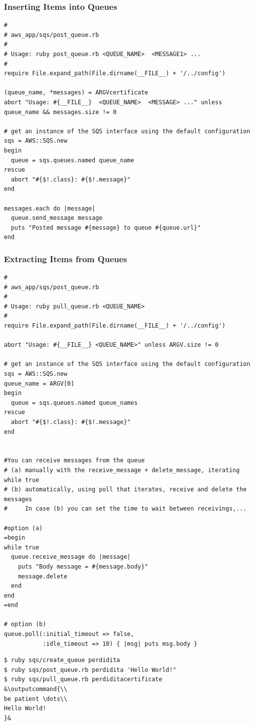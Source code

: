 \documentclass{beamer}
\newcommand{\outputcommand}[1]{\color{darkgreen}{#1|}}
\begin{document}
\begin{frame}
\frametitle{Inserting Items into Queues}
\lstset{language=Ruby, style=eclipse}
\begin{lstlisting}[escapechar=&]
#
# aws_app/sqs/post_queue.rb
#
# Usage: ruby post_queue.rb <QUEUE_NAME>  <MESSAGE1> ...
#
require File.expand_path(File.dirname(__FILE__) + '/../config')

(queue_name, *messages) = ARGVcertificate
abort "Usage: #{__FILE__}  <QUEUE_NAME>  <MESSAGE> ..." unless queue_name && messages.size != 0

# get an instance of the SQS interface using the default configuration
sqs = AWS::SQS.new
begin
  queue = sqs.queues.named queue_name
rescue
  abort "#{$!.class}: #{$!.message}"
end

messages.each do |message|
  queue.send_message message
  puts "Posted message #{message} to queue #{queue.url}"
end
\end{lstlisting}
\end{frame}
\begin{frame}
\frametitle{Extracting Items from Queues}
\lstset{language=Ruby, style=eclipse}
\begin{lstlisting}[escapechar=&]
#
# aws_app/sqs/post_queue.rb
#
# Usage: ruby pull_queue.rb <QUEUE_NAME>
#
require File.expand_path(File.dirname(__FILE__) + '/../config')

abort "Usage: #{__FILE__} <QUEUE_NAME>" unless ARGV.size != 0

# get an instance of the SQS interface using the default configuration
sqs = AWS::SQS.new
queue_name = ARGV[0]
begin
  queue = sqs.queues.named queue_names
rescue
  abort "#{$!.class}: #{$!.message}"
end


#You can receive messages from the queue 
# (a) manually with the receive_message + delete_message, iterating while true
# (b) automatically, using poll that iterates, receive and delete the messages
#     In case (b) you can set the time to wait between receivings,...

#option (a)
=begin
while true
  queue.receive_message do |message|
    puts "Body message = #{message.body}"
    message.delete
  end
end
=end

# option (b)
queue.poll(:initial_timeout => false,
           :idle_timeout => 10) { |msg| puts msg.body }
\end{lstlisting}

\lstset{language=shell}
\begin{lstlisting}[escapechar=&]
$ ruby sqs/create_queue perdidita
$ ruby sqs/post_queue.rb perdidita 'Hello World!"
$ ruby sqs/pull_queue.rb perdiditacertificate
&\outputcommand{\\
be patient \dots\\
Hello World!
}&
\end{lstlisting}
\end{frame}
\end{document}
